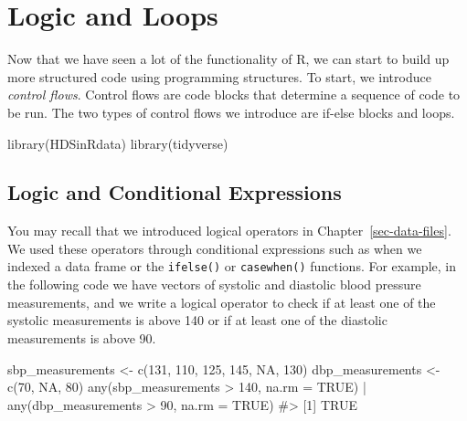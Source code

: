 \documentclass[
  letterpaper,
]{latex/krantz}
\makeatletter
\newenvironment{Shaded}{\begin{snugshade}}{\end{snugshade}}
\newcommand{\AttributeTok}[1]{\textcolor[rgb]{0.40,0.45,0.13}{#1}}
\newcommand{\CommentTok}[1]{\textcolor[rgb]{0.37,0.37,0.37}{#1}}
\newcommand{\ConstantTok}[1]{\textcolor[rgb]{0.56,0.35,0.01}{#1}}
\newcommand{\DecValTok}[1]{\textcolor[rgb]{0.68,0.00,0.00}{#1}}
\newcommand{\FunctionTok}[1]{\textcolor[rgb]{0.28,0.35,0.67}{#1}}
\newcommand{\NormalTok}[1]{\textcolor[rgb]{0.00,0.23,0.31}{#1}}
\newcommand{\OtherTok}[1]{\textcolor[rgb]{0.00,0.23,0.31}{#1}}
\newcommand{\SpecialCharTok}[1]{\textcolor[rgb]{0.37,0.37,0.37}{#1}}
\newenvironment{kframe}{%
\medskip{}
\setlength{\fboxsep}{.8em}
 \def\at@end@of@kframe{}%
 \ifinner\ifhmode%
  \def\at@end@of@kframe{\end{minipage}}%
  \begin{minipage}{\columnwidth}%
 \fi\fi%
 \def\FrameCommand##1{\hskip\@totalleftmargin \hskip-\fboxsep
 \colorbox{shadecolor}{##1}\hskip-\fboxsep
     \hskip-\linewidth \hskip-\@totalleftmargin \hskip\columnwidth}%
 \MakeFramed {\advance\hsize-\width
   \@totalleftmargin\z@ \linewidth\hsize
   \@setminipage}}%
 {\par\unskip\endMakeFramed%
 \at@end@of@kframe}
\renewenvironment{Shaded}{\begin{kframe}}{\end{kframe}}
\makeatother
\begin{document}
\chapter{Logic and Loops}\label{sec-control-flows}

Now that we have seen a lot of the functionality of R, we can start to
build up more structured code using programming structures. To start, we
introduce \emph{control flows}. Control flows are
code blocks that determine a sequence of code to be run. The two types
of control flows we introduce are if-else blocks and loops.

\begin{Shaded}
\begin{Highlighting}[]
\FunctionTok{library}\NormalTok{(HDSinRdata)}
\FunctionTok{library}\NormalTok{(tidyverse)}
\end{Highlighting}
\end{Shaded}

\section{\texorpdfstring{Logic and Conditional Expressions
}{Logic and Conditional Expressions }}\label{logic-and-conditional-expressions}

You may recall that we introduced logical operators in
Chapter~\ref{sec-data-files}. We used these operators through
conditional expressions such as when we indexed a data frame or the
\texttt{ifelse()} or
\texttt{casewhen()}
functions. For example, in the following code we have vectors of
systolic and diastolic blood pressure measurements, and we write a
logical operator to check if at least one of the systolic measurements
is above 140 or if at least one of the diastolic measurements is above
90.

\begin{Shaded}
\begin{Highlighting}[]
\NormalTok{sbp\_measurements }\OtherTok{\textless{}{-}} \FunctionTok{c}\NormalTok{(}\DecValTok{131}\NormalTok{, }\DecValTok{110}\NormalTok{, }\DecValTok{125}\NormalTok{, }\DecValTok{145}\NormalTok{, }\ConstantTok{NA}\NormalTok{, }\DecValTok{130}\NormalTok{)}
\NormalTok{dbp\_measurements }\OtherTok{\textless{}{-}} \FunctionTok{c}\NormalTok{(}\DecValTok{70}\NormalTok{, }\ConstantTok{NA}\NormalTok{, }\DecValTok{80}\NormalTok{)}
\FunctionTok{any}\NormalTok{(sbp\_measurements }\SpecialCharTok{\textgreater{}} \DecValTok{140}\NormalTok{, }\AttributeTok{na.rm =} \ConstantTok{TRUE}\NormalTok{) }\SpecialCharTok{|} 
  \FunctionTok{any}\NormalTok{(dbp\_measurements }\SpecialCharTok{\textgreater{}} \DecValTok{90}\NormalTok{, }\AttributeTok{na.rm =} \ConstantTok{TRUE}\NormalTok{)}
\CommentTok{\#\textgreater{} [1] TRUE}
\end{Highlighting}
\end{Shaded}
\end{document}
